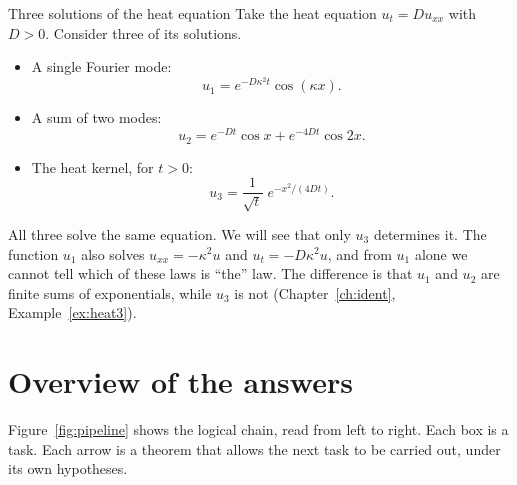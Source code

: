 \begin{example}{Three solutions of the heat equation}
Take the heat equation $u_t=Du_{xx}$ with $D>0$. Consider three of its solutions.
\begin{itemize}
\item A single Fourier mode:
\[
u_1=e^{-D\kappa^2t}\cos(\kappa x).
\]
\item A sum of two modes:
\[
u_2=e^{-Dt}\cos x+e^{-4Dt}\cos 2x.
\]
\item The heat kernel, for $t>0$:
\[
u_3=\frac{1}{\sqrt{t}}\;e^{-x^2/(4Dt)}.
\]
\end{itemize}
All three solve the same equation. We will see that only $u_3$ determines it. The function $u_1$ also solves $u_{xx}=-\kappa^2u$ and $u_t=-D\kappa^2u$, and from $u_1$ alone we cannot tell which of these laws is ``the'' law. The difference is that $u_1$ and $u_2$ are finite sums of exponentials, while $u_3$ is not (Chapter~\ref{ch:ident}, Example~\ref{ex:heat3}).
\end{example}

\section{Overview of the answers}

Figure~\ref{fig:pipeline} shows the logical chain, read from left to right. Each box is a task. Each arrow is a theorem that allows the next task to be carried out, under its own hypotheses.

